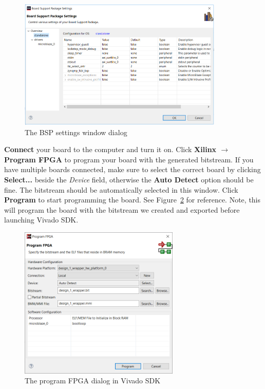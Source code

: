 \documentclass[11pt]{article}
\begin{document}
\begin{figure}[!b]
    \centering
    \includegraphics[width=0.87\textwidth]{images/bsp_settings.png}
    \caption{The BSP settings window dialog}
    \label{fig:bsp_settings}
\end{figure}

\textbf{Connect} your board to the computer and turn it on. Click \textbf{Xilinx $\rightarrow$ Program FPGA} to program your board with the generated bitstream. If you have multiple boards connected, make sure to select the correct board by clicking \textbf{Select...} beside the \textit{Device} field, otherwise the \textbf{Auto Detect} option should be fine. The bitstream should be automatically selected in this window. Click \textbf{Program} to start programming the board. See Figure~\ref{fig:program_fpga} for reference. Note, this will program the board with the bitstream we created and exported before launching Vivado SDK.

\begin{figure}[!b]
    \centering
    \includegraphics[width=0.68\textwidth]{images/program_fpga.png}
    \caption{The program FPGA dialog in Vivado SDK}
    \label{fig:program_fpga}
\end{figure}
\end{document}
